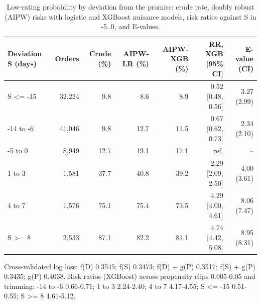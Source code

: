 \begin{table}[!htbp]
\centering
\footnotesize
\caption{Low-rating probability by deviation from the promise: crude rate, doubly robust (AIPW) risks with logistic and XGBoost nuisance models, risk ratios against S in -5..0, and E-values.}
\label{tab:rq2}
\begin{tabular}{lrrrrrr}
\toprule
Deviation S (days) & Orders & Crude (\%) & AIPW-LR (\%) & AIPW-XGB (\%) & RR, XGB [95\% CI] & E-value (CI) \\
\midrule
S <= -15 & 32,224 & 9.8 & 8.6 & 8.9 & 0.52 [0.48, 0.56] & 3.27 (2.99) \\
-14 to -6 & 41,046 & 9.8 & 12.7 & 11.5 & 0.67 [0.62, 0.73] & 2.34 (2.10) \\
-5 to 0 & 8,949 & 12.7 & 19.1 & 17.1 & ref. & -- \\
1 to 3 & 1,581 & 37.7 & 40.8 & 39.2 & 2.29 [2.09, 2.50] & 4.00 (3.61) \\
4 to 7 & 1,576 & 75.1 & 75.4 & 73.5 & 4.29 [4.00, 4.61] & 8.06 (7.47) \\
S >= 8 & 2,533 & 87.1 & 82.2 & 81.1 & 4.74 [4.42, 5.08] & 8.95 (8.31) \\
\bottomrule
\end{tabular}
\par\smallskip
\parbox{\linewidth}{\scriptsize Cross-validated log loss: f(D) 0.3545; f(S) 0.3473; f(D) + g(P) 0.3517; f(S) + g(P) 0.3435; g(P) 0.4038. Risk ratios (XGBoost) across propensity clips 0.005-0.05 and trimming: -14 to -6 0.66-0.71; 1 to 3 2.24-2.40; 4 to 7 4.17-4.55; S <= -15 0.51-0.55; S >= 8 4.61-5.12.}
\end{table}

